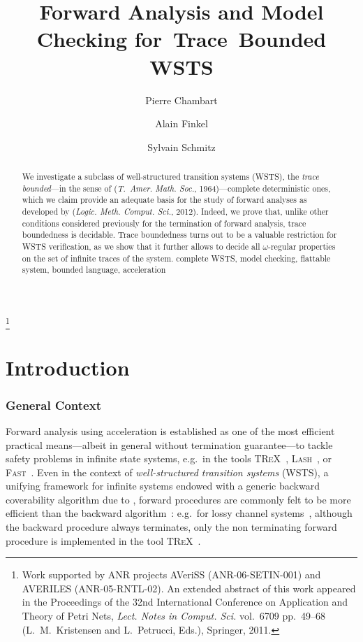 \documentclass[11pt,reqno,a4paper]{amsart}
\theoremstyle{plain}
\theoremstyle{definition}
\theoremstyle{remark}
\renewcommand{\paragraph}{\subsubsection*}
\renewcommand{\subsectionautorefname}{Section}
\renewcommand{\subsubsectionautorefname}{Section}
\renewcommand{\sectionautorefname}{Section}
\renewcommand{\subsectionautorefname}{Section}
\renewcommand{\subsubsectionautorefname}{Section}
\providecommand{\subfigureautorefname}{Figure}
\begin{document}
\providecommand{\subfigureautorefname}{Fig.$\!$}
\def\sectionautorefname{Section} \def\subsectionautorefname{Section}
\renewcommand\subsubsectionautorefname[1]{\S}
\def\subfigureautorefname{Figure} \def\chapterautorefname{Chapter}

\title{Forward Analysis and Model Checking \mbox{for Trace Bounded} WSTS}
\thanks{Work supported by ANR projects AVeriSS (ANR-06-SETIN-001) and
  AVERILES (ANR-05-RNTL-02).  An extended abstract of this work
  appeared in the Proceedings of the 32nd International Conference on
  Application and Theory of Petri Nets, \emph{Lect. Notes in
    Comput. Sci.} vol.~6709 pp.~49--68 (L.\ M.~Kristensen and
  L.~Petrucci, Eds.), Springer, 2011.}  \author[P.~Chambart]{Pierre
  Chambart} \address{OCamlPro} \author[A.~Finkel]{Alain Finkel}
\author[S.~Schmitz]{Sylvain Schmitz} \address{LSV, ENS Cachan \& CNRS
  \& INRIA, Universit\'e Paris-Saclay, France}
\begin{abstract}
  We investigate a subclass of well-structured transition systems
  (WSTS), the \emph{trace bounded}---in the sense of \citeauthor{bcfl}
  (\emph{T.~Amer. Math. Soc.}, 1964)---complete deterministic ones, which we
  claim provide an adequate basis for the study of forward analyses as
  developed by \citeauthor{cwsts2} (\emph{Logic. Meth. Comput. Sci.},
  2012).  Indeed, we prove that, unlike other conditions considered
  previously for the termination of forward analysis, trace
  boundedness is decidable.  Trace boundedness turns out to be a
  valuable restriction for WSTS verification, as we show that it
  further allows to decide all $\omega$-regular properties on the set
  of infinite traces of the system.  \keywords complete WSTS, model
  checking, flattable system, bounded language, acceleration
\end{abstract}
\maketitle

\section{Introduction}
\paragraph{General Context} Forward analysis using acceleration
\citep{accel,flataccel} is established as one of the most efficient
practical means---albeit in general without termination guarantee---to
tackle safety problems in infinite state systems, e.g.\ in the tools
\textsc{TReX}~\citep{trex}, \textsc{Lash}~\citep{lash}, or
\textsc{Fast}~\citep{fast}.  Even in the context of
\emph{well-structured transition systems} (WSTS), a unifying framework
for infinite systems endowed with a generic backward coverability
algorithm due to \citet{wqo}, forward procedures are commonly felt to
be more efficient than the backward algorithm~\citep{prevspost}: e.g.\
for lossy channel systems~\citep{lcs}, although the backward procedure
always terminates, only the non terminating forward procedure is
implemented in the tool \textsc{TReX}~\citep{trex}.
\end{document}
